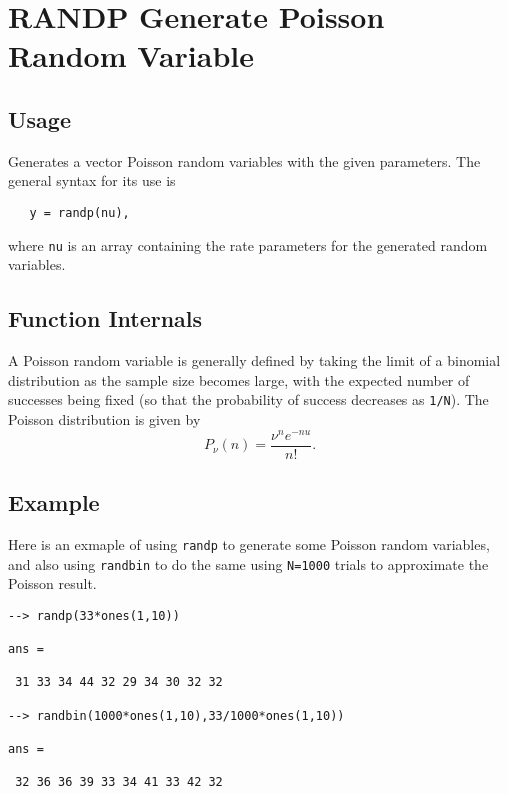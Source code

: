 \section{RANDP Generate Poisson Random Variable}

\subsection{Usage}

Generates a vector Poisson random variables with the given
parameters.  The general syntax for its use is
\begin{verbatim}
   y = randp(nu),
\end{verbatim}
where \verb|nu| is an array containing the rate parameters
for the generated random variables.  
\subsection{Function Internals}

A Poisson random variable is generally defined by taking the
limit of a binomial distribution as the sample size becomes
large, with the expected number of successes being fixed (so
that the probability of success decreases as \verb|1/N|).  
The Poisson distribution is given by
\[
  P_{\nu}(n) = \frac{\nu^n e^{-nu}}{n!}.
\]
\subsection{Example}

Here is an exmaple of using \verb|randp| to generate some Poisson
random variables, and also using \verb|randbin| to do the same
using \verb|N=1000| trials to approximate the Poisson result.
\begin{verbatim}
--> randp(33*ones(1,10))

ans = 

 31 33 34 44 32 29 34 30 32 32 

--> randbin(1000*ones(1,10),33/1000*ones(1,10))

ans = 

 32 36 36 39 33 34 41 33 42 32 
\end{verbatim}
